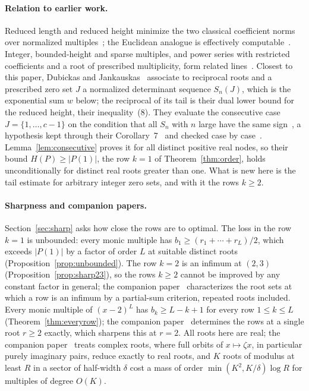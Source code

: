 \documentclass[11pt]{article}
\begin{document}
\paragraph{Relation to earlier work.}
Reduced length and reduced height minimize the two classical coefficient
norms over normalized multiples~\cite{dubickas,schinzel,schinzel-ii,schinzel-complex,dj};
the Euclidean analogue is effectively computable~\cite{frw}.  Integer,
bounded-height and sparse multiples, and power series with restricted
coefficients and a root of prescribed multiplicity, form related
lines~\cite{mignotte,bombieri-vaaler,bbbp-multiple,bbbp-ray,grt}.  Closest to
this paper, Dubickas and Jankauskas~\cite{dj} associate to reciprocal roots
and a prescribed zero set $J$ a normalized determinant sequence $S_n(J)$,
which is the exponential sum $w$ below; the reciprocal of its tail is their
dual lower bound for the reduced height, their inequality~(8).  They
evaluate the consecutive case $J=\{1,\ldots,c-1\}$ on the condition that
all $S_n$ with $n$ large have the same sign~\cite[p.~333]{dj}, a hypothesis
kept through their Corollary~7~\cite[Section~2]{dj} and checked case by
case~\cite[Sections~3--4]{dj}.  Lemma~\ref{lem:consecutive} proves it for
all distinct positive real nodes, so their bound $H(P)\ge|P(1)|$, the row
$k=1$ of Theorem~\ref{thm:order}, holds unconditionally for distinct real
roots greater than one.  What is new here is the tail estimate for
arbitrary integer zero sets, and with it the rows $k\ge2$.

\paragraph{Sharpness and companion papers.}
Section~\ref{sec:sharp} asks how close the rows are to optimal.  The loss
in the row $k=1$ is unbounded: every monic multiple has
$b_1\ge(r_1+\cdots+r_L)/2$, which exceeds $|P(1)|$ by a factor of order $L$
at suitable distinct roots (Proposition~\ref{prop:unbounded}).  The row
$k=2$ is an infimum at $(2,3)$ (Proposition~\ref{prop:sharp23}), so the rows
$k\ge2$ cannot be improved by any constant factor in general; the companion
paper~\cite{coefficient-mass-attainment} characterizes the root sets at which
a row is an infimum by a partial-sum criterion, repeated roots included.
Every monic multiple of $(x-2)^L$ has $b_k\ge L-k+1$ for every row
$1\le k\le L$ (Theorem~\ref{thm:everyrow}); the companion
paper~\cite{coefficient-mass-rows} determines the rows at a single root
$r\ge2$ exactly, which sharpens this at $r=2$.  All roots here are real; the
companion paper~\cite{coefficient-mass-complex} treats complex roots, where
full orbits of $x\mapsto\zeta x$, in particular purely imaginary pairs,
reduce exactly to real roots, and $K$ roots of modulus at least $R$ in a
sector of half-width $\delta$ cost a mass of order
$\min(K^2,K/\delta)\log R$ for multiples of degree $O(K)$.
\end{document}

